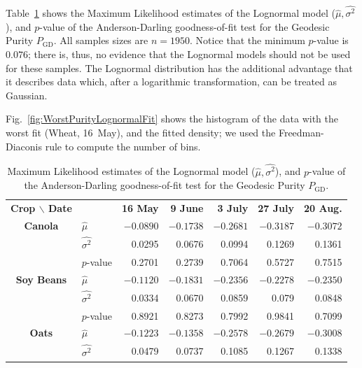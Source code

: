 \documentclass[journal]{IEEEtran}
\begin{document}
	Table~\ref{tab:params_purity} shows the Maximum Likelihood estimates of the Lognormal model ($\widehat \mu,\widehat{\sigma^2}$), and $p$-value of the Anderson-Darling goodness-of-fit test for the Geodesic Purity $P_{\text{GD}}$.
	All samples sizes are $n=1950$.
	Notice that the minimum $p$-value is $0.076$; there is, thus, no evidence that the Lognormal models should not be used for these samples.
	The Lognormal distribution has the additional advantage that it describes data which, after a logarithmic transformation, can be treated as Gaussian.
	
	Fig.~\ref{fig:WorstPurityLognormalFit} shows the histogram of the data with the worst fit (Wheat, 16~May), and the fitted density; we used the Freedman-Diaconis rule to compute the number of bins.
	
	\begin{table}[hbt]
		\centering
		\caption{Maximum Likelihood estimates of the Lognormal model ($\widehat \mu,\widehat{\sigma^2}$), and $p$-value of the Anderson-Darling goodness-of-fit test for the Geodesic Purity $P_{\text{GD}}$.}
		\label{tab:params_purity}
		\setlength{\tabcolsep}{2pt}
		\begin{tabular}{clrrrrr}
			\toprule
			\textbf{Crop $\backslash$ Date} & & \textbf{16 May} & \textbf{9 June} & \textbf{3 July} & \textbf{27 July} & \textbf{20 Aug.}\\ \cmidrule(lr){1-2} \cmidrule(lr){3-3} \cmidrule(lr){4-4} \cmidrule(lr){5-5} \cmidrule(lr){6-6} \cmidrule(lr){7-7}
			\textbf{Canola}     
			& $\widehat{\mu}$         & $-0.0890$  & $-0.1738$   & $-0.2681$   & $-0.3187$   & $-0.3072$ \\
			& $\widehat{\sigma^2}$     & 0.0295     & 0.0676     & 0.0994     & 0.1269      & 0.1361 \\ 
			& $p$-value             & 0.2701    & 0.2739     & 0.7064     & 0.5727     & 0.7515\\        
			\midrule
			\textbf{Soy Beans}
			& $\widehat{\mu}$         & $-0.1120$    & $-0.1831$    & $-0.2356$ & $-0.2278$ & $-0.2350$         \\
			& $\widehat{\sigma^2}$     & 0.0334       & 0.0670       & 0.0859       & 0.079       & 0.0848 \\ 
			& $p$-value             & 0.8921     & 0.8273     & 0.7992     & 0.9841     & 0.7099\\            
			\midrule
			\textbf{Oats}
			& $\widehat{\mu}$         & $-0.1223$ & $-0.1358$    & $-0.2578$ & $-0.2679$    & $-0.3008$ \\
			& $\widehat{\sigma^2}$     & 0.0479     & 0.0737       & 0.1085     & 0.1267      & 0.1338 \\ 

\end{tabular}
\end{table}
\end{document}
